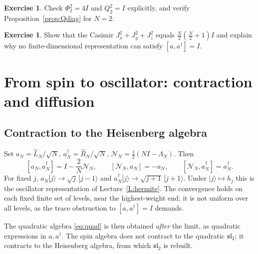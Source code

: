 \documentclass[11pt,reqno]{amsart}
\theoremstyle{definition}
\newtheorem{exercise}[theorem]{Exercise}
\theoremstyle{remark}
\newcommand{\NN}{\mathcal N}
\newcommand{\Id}{I}
\begin{document}
\begin{exercise}
Check $\Phi_2^2=4\Id$ and $Q_2^2=\Id$ explicitly, and verify
Proposition~\ref{prop:Qdiag} for $N=2$.
\end{exercise}
\begin{exercise}
Show that the Casimir $J_x^2+J_y^2+J_z^2$ equals
$\frac N2(\frac N2+1)\Id$ and explain why no finite-dimensional
representation can satisfy $[a,a^\dagger]=\Id$.
\end{exercise}

\section{From spin to oscillator: contraction and diffusion}\label{L:limits}

\subsection{Contraction to the Heisenberg algebra}
Set $a_N=\widehat L_N/\sqrt N$, $a_N^\dagger=\widehat R_N/\sqrt N$,
$\NN_N=\frac12(N\Id-\Lambda_N)$. Then
\begin{equation}\label{eq:contr}
[a_N,a_N^\dagger]=\Id-\frac{2}{N}\NN_N,\qquad
[\NN_N,a_N]=-a_N,\qquad[\NN_N,a_N^\dagger]=a_N^\dagger.
\end{equation}
For fixed $j$, $a_N|j\rangle\to\sqrt j\,|j-1\rangle$ and
$a_N^\dagger|j\rangle\to\sqrt{j+1}\,|j+1\rangle$. Under $|j\rangle\mapsto h_j$
this is the oscillator representation of Lecture~\ref{L:hermite}. The
convergence holds on each fixed finite set of levels, near the
highest-weight end; it is not uniform over all levels, as the trace
obstruction to $[a,a^\dagger]=\Id$ demands.

The quadratic algebra \eqref{eq:quad} is then obtained \emph{after} the
limit, as quadratic expressions in $a,a^\dagger$. The spin algebra does
not contract to the quadratic $\mathfrak{sl}_2$; it contracts to the
Heisenberg algebra, from which $\mathfrak{sl}_2$ is rebuilt.
\end{document}

